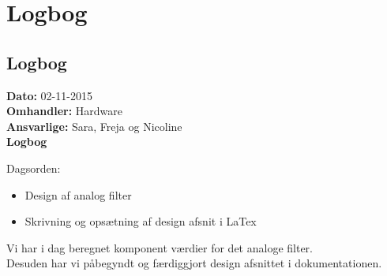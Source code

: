 \chapter{Logbog}
\section{Logbog}

\textbf{Dato:} 02-11-2015 \\
\textbf{Omhandler:} Hardware \\
\textbf{Ansvarlige:} Sara, Freja og Nicoline \\
\textbf{Logbog}

Dagsorden:
\begin{itemize}
	\item Design af analog filter
	\item Skrivning og opsætning af design afsnit i LaTex
\end{itemize}

Vi har i dag beregnet komponent værdier for det analoge filter.\\
Desuden har vi påbegyndt og færdiggjort design afsnittet i dokumentationen.\\

   
